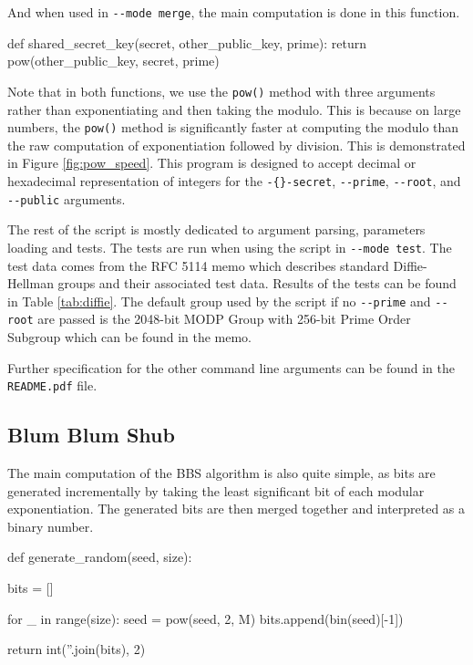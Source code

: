 \documentclass{article}
\begin{document}
And when used in \verb+--mode merge+, the main computation is done in this function.

\bigskip
\begin{python}
def shared_secret_key(secret, other_public_key, prime):
    return pow(other_public_key, secret, prime)
\end{python}
\bigskip

Note that in both functions, we use the \verb+pow()+ method with three arguments rather than exponentiating and then taking the modulo. This is because on large numbers, the \verb+pow()+ method is significantly faster at computing the modulo than the raw computation of exponentiation followed by division. This is demonstrated in Figure \ref{fig:pow_speed}. 
This program is designed to accept decimal or hexadecimal representation of integers for the \verb+-{}-secret+, \verb+--prime+, \verb+--root+, and \verb+--public+ arguments.

The rest of the script is mostly dedicated to argument parsing, parameters loading and tests. The tests are run when using the script in \verb+--mode test+. The test data comes from the RFC 5114\cite{rfc5114} memo which describes standard Diffie-Hellman groups and their associated test data. Results of the tests can be found in Table \ref{tab:diffie}. The default group used by the script if no \verb+--prime+ and \verb+--root+ are passed is the 2048-bit MODP Group with 256-bit Prime Order Subgroup which can be found in the memo. 

Further specification for the other command line arguments can be found in the \verb+README.pdf+ file.

\subsection{Blum Blum Shub}

The main computation of the BBS algorithm is also quite simple, as bits are generated incrementally by taking the least significant bit of each modular exponentiation. The generated bits are then merged together and interpreted as a binary number.

\bigskip
\begin{python}
def generate_random(seed, size):

    bits = []

    for _ in range(size):
        seed = pow(seed, 2, M)
        bits.append(bin(seed)[-1])
    
    return int(''.join(bits), 2)
\end{python}
\bigskip
\end{document}

